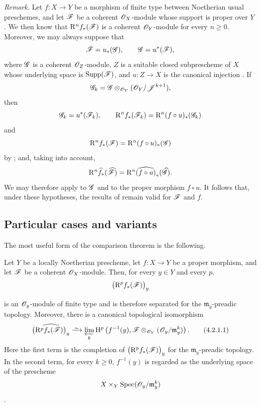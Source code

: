 \begin{env}[4.1.10]
\label{III.4.1.10}
\emph{Remark.}
Let $f:X\to Y$ be a morphism of finite type between Noetherian usual
preschemes, and let $\mathscr{F}$ be a coherent $\mathscr{O}_X$-module whose
support is proper over $Y$ .
We then know  that $\mathrm{R}^n f_*(\mathscr{F})$ is a coherent
$\mathscr{O}_Y$-module for every $n\geq0$.
Moreover, we may always suppose that
\[
  \mathscr{F}=u_*(\mathscr{G}),
  \qquad
  \mathscr{G}=u^*(\mathscr{F}),
\]
where $\mathscr{G}$ is a coherent $\mathscr{O}_Z$-module, $Z$ is a suitable
closed subprescheme of $X$ whose underlying space is
$\operatorname{Supp}(\mathscr{F})$, and $u:Z\to X$ is the canonical injection
.
If
\[
  \mathscr{G}_k
  =
  \mathscr{G}\otimes_{\mathscr{O}_Y}
  (\mathscr{O}_Y/\mathscr{J}^{k+1}),
\]
then
\[
  \mathscr{G}_k=u^*(\mathscr{F}_k),
  \qquad
  \mathrm{R}^n f_*(\mathscr{F}_k)
  =
  \mathrm{R}^n(f\circ u)_*(\mathscr{G}_k)
\]
and
\[
  \mathrm{R}^n f_*(\mathscr{F})
  =
  \mathrm{R}^n(f\circ u)_*(\mathscr{G})
\]
by ; and, taking  into account,
\[
  \mathrm{R}^n\widehat{f}_*(\widehat{\mathscr{F}})
  =
  \mathrm{R}^n\widehat{(f\circ u)}_*(\widehat{\mathscr{G}}).
\]
We may therefore apply  to $\mathscr{G}$ and to the proper
morphism $f\circ u$.
It follows that, under these hypotheses, the results of
 remain valid for $\mathscr{F}$ and $f$.
\end{env}


\subsection{Particular cases and variants}
\label{subsection:III.4.2}

The most useful form of the comparison theorem  is
the following.

\begin{proposition}[4.2.1]
\label{III.4.2.1}
Let $Y$ be a locally Noetherian prescheme, let $f:X\to Y$ be a
proper morphism, and let $\mathscr{F}$ be a coherent $\mathscr{O}_X$-module.
Then, for every $y\in Y$ and every $p$,
\[
  \bigl(\mathrm{R}^p f_*(\mathscr{F})\bigr)_y
\]


is an $\mathscr{O}_y$-module of finite type and is therefore separated
for the $\mathfrak{m}_y$-preadic topology.
Moreover, there is a canonical topological isomorphism
\[
  \widehat{\bigl(\RR^p f_*(\sh{F})\bigr)_y}
  \isoto
  \varprojlim_k
  \HH^p\left(
    f^{-1}(y),
    \sh{F}\otimes_{\sh{O}_Y}
    (\sh{O}_y/\mathfrak{m}_y^k)
  \right).
  \tag{4.2.1.1}
  \label{III.4.2.1.1}
\]
Here the first term is the completion of
$\bigl(\mathrm{R}^p f_*(\mathscr{F})\bigr)_y$ for the
$\mathfrak{m}_y$-preadic topology.
In the second term, for every $k\geq0$, $f^{-1}(y)$ is regarded as
the underlying space of the prescheme
\[
  X\times_Y\operatorname{Spec}(\mathscr{O}_y/\mathfrak{m}_y^k)
\]
.
\end{proposition}

